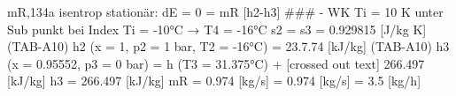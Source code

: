 mR,134a isentrop
stationär: dE = 0 = mR [h2-h3] ### - WK
Ti = 10 K unter Sub punkt bei Index
Ti = -10°C → T4 = -16°C
s2 = s3 = 0.929815 [J/kg K] (TAB-A10)
h2 (x = 1, p2 = 1 bar, T2 = -16°C) = 23.7.74 [kJ/kg] (TAB-A10)
h3 (x = 0.95552, p3 = 0 bar) = h (T3 = 31.375°C) + [crossed out text]
266.497 [kJ/kg]
h3 = 266.497 [kJ/kg]
mR = 0.974 [kg/s]
= 0.974 [kg/s] = 3.5 [kg/h]